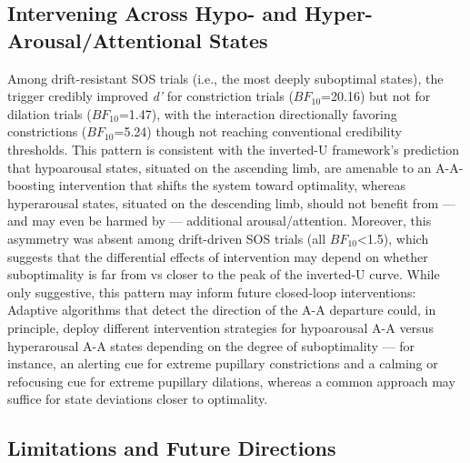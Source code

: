 \subsection{Intervening Across Hypo- and Hyper- Arousal/Attentional States}

Among drift-resistant SOS trials (i.e., the most deeply suboptimal states), the trigger credibly improved \textit{d'} for constriction trials ($BF_{10}$=20.16) but not for dilation trials ($BF_{10}$=1.47), with the interaction directionally favoring constrictions ($BF_{10}$=5.24) though not reaching conventional credibility thresholds. This pattern is consistent with the inverted-U framework's prediction that hypoarousal states, situated on the ascending limb, are amenable to an A-A-boosting intervention that shifts the system toward optimality, whereas hyperarousal states, situated on the descending limb, should not benefit from — and may even be harmed by — additional arousal/attention. Moreover, this asymmetry was absent among drift-driven SOS trials (all $BF_{10}$\textless1.5), which suggests that the differential effects of intervention may depend on whether suboptimality is far from vs closer to the peak of the inverted-U curve. While only suggestive, this pattern may inform future closed-loop interventions: Adaptive algorithms that detect the direction of the A-A departure could, in principle, deploy different intervention strategies for hypoarousal A-A versus hyperarousal A-A states depending on the degree of suboptimality — for instance, an alerting cue for extreme pupillary constrictions and a calming or refocusing cue for extreme pupillary dilations, whereas a common approach may suffice for state deviations closer to optimality.

\subsection{Limitations and Future Directions}

